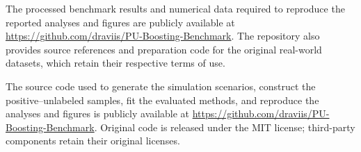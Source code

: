 
The processed benchmark results and numerical data required to reproduce
the reported analyses and figures are publicly available at
\url{https://github.com/draviis/PU-Boosting-Benchmark}.
The repository also provides source references and preparation code for
the original real-world datasets, which retain their respective terms
of use.

The source code used to generate the simulation scenarios, construct
the positive--unlabeled samples, fit the evaluated methods, and reproduce
the analyses and figures is publicly available at
\url{https://github.com/draviis/PU-Boosting-Benchmark}.
Original code is released under the MIT license; third-party components
retain their original licenses.
